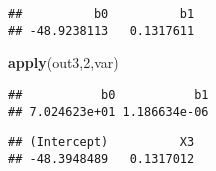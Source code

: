 \documentclass[
]{article}
\newenvironment{Shaded}{\begin{snugshade}}{\end{snugshade}}
\newcommand{\DecValTok}[1]{\textcolor[rgb]{0.00,0.00,0.81}{#1}}
\newcommand{\KeywordTok}[1]{\textcolor[rgb]{0.13,0.29,0.53}{\textbf{#1}}}
\newcommand{\NormalTok}[1]{#1}
\newcommand{\OperatorTok}[1]{\textcolor[rgb]{0.81,0.36,0.00}{\textbf{#1}}}
\begin{document}
\begin{verbatim}
##          b0          b1 
## -48.9238113   0.1317611
\end{verbatim}

\begin{Shaded}
\begin{Highlighting}[]
\KeywordTok{apply}\NormalTok{(out3,}\DecValTok{2}\NormalTok{,var)}
\end{Highlighting}
\end{Shaded}

\begin{verbatim}
##           b0           b1 
## 7.024623e+01 1.186634e-06
\end{verbatim}

\begin{Shaded}
\end{Shaded}

\begin{verbatim}
## (Intercept)          X3 
## -48.3948489   0.1317012
\end{verbatim}
\end{document}
